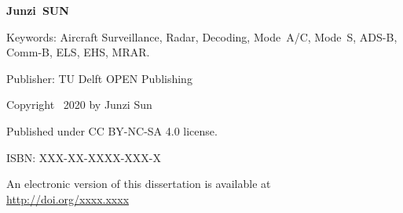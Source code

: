 \begin{titlepage}

\thispagestyle{empty}

\vspace*{2\bigskipamount}

{\makeatletter
\titlestyle\bfseries\Huge\@title
\makeatother}

{\makeatletter
\ifx\@subtitle\undefined\else
    \bigskip
    \titlefont\titleshape\LARGE\@subtitle
\fi
\makeatother}


\vspace*{8\bigskipamount}


\makeatletter
{\huge\titlefont\bfseries{Junzi}\ {SUN}}
\makeatother

\vspace*{8\bigskipamount}

\makeatletter
{\large{}}
\makeatother


\clearpage


\thispagestyle{empty}

\vspace*{25\bigskipamount}



Keywords: Aircraft Surveillance, Radar, Decoding, Mode~A/C, Mode~S, ADS-B, Comm-B, ELS, EHS, MRAR.

\medskip

Publisher: TU Delft OPEN Publishing

\vspace{4\bigskipamount}


Copyright \textcopyright\ 2020 by Junzi Sun

\medskip

Published under CC BY-NC-SA 4.0 license.

\medskip
ISBN: XXX-XX-XXXX-XXX-X

\medskip
\medskip
An electronic version of this dissertation is available at \\
\url{http://doi.org/xxxx.xxxx}

\end{titlepage}